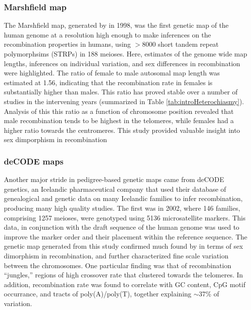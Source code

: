 \subsubsection{Marshfield map}
The Marshfield map, generated by \citet{Broman1998} in 1998, was the first genetic map of the human genome at a resolution high enough to make inferences on the recombination properties in humans, using $>$8000 short tandem repeat polymorphsims (STRPs) in 188 meioses.
Here, estimates of the genome wide map lengths, inferences on individual variation, and sex differences in recombination were highlighted.
The ratio of female to male autosomal map length was estimated at 1.56, indicating that the recombination rate in females is substantially higher than males.
This ratio has proved stable over a number of studies in the intervening years (summarized in Table \ref{tab:introHeterochiasmy}).
Analysis of this this ratio as a function of chromosome position revealed that male recombination tends to be highest in the telomeres, while females had a higher ratio towards the centromeres.
This study provided valuable insight into sex dimporphism in recombination

\subsubsection{deCODE maps}
Another major stride in pedigree-based genetic maps came from deCODE genetics, an Icelandic pharmaceutical company that used their database of genealogical and genetic data on many Icelandic families to infer recombination, producing many high quality studies.
The first was in 2002, where 146 families, comprising 1257 meioses, were genotyped using 5136 microsatellite markers\cite{Kong2002}.
This data, in conjunction with the draft sequence of the human genome\cite{Venter2001,Lander2001} was used to improve the marker order and their placement within the reference sequence.
The genetic map generated from this study confirmed much found by \citet{Broman1998} in terms of sex dimorphism in recombination, and further characterized fine scale variation between the chromosomes.
One particular finding was that of recombination ``jungles,'' regions of high crossover rate that clustered towards the telomeres.
In addition, recombination rate was found to correlate with GC content, CpG motif occurrance, and tracts of poly(A)/poly(T), together explaining $\sim$37\% of variation.

